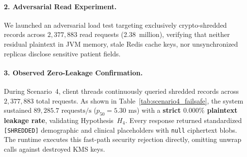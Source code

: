 \paragraph{2. Adversarial Read Experiment.}
We launched an adversarial load test targeting exclusively crypto-shredded records across $2{,}377{,}883$ read requests (2.38~million), verifying that neither residual plaintext in JVM memory, stale Redis cache keys, nor unsynchronized replicas disclose sensitive patient fields.

\begin{table}[H]
  \centering
  \caption{Post-Shred Access Latency and Zero Data Leakage Verification (Scenario 4).}
  \label{tab:scenario4_failsafe}
\end{table}

\paragraph{3. Observed Zero-Leakage Confirmation.}
During Scenario~4, client threads continuously queried shredded records across $2{,}377{,}883$ total requests. As shown in Table~\ref{tab:scenario4_failsafe}, the system sustained $89,285.7\text{~requests/s}$ ($p_{50} = 5.30\text{~ms}$) with a \textbf{strict $0.000\%$ plaintext leakage rate}, validating Hypothesis~$H_4$. Every response returned standardized \texttt{[SHREDDED]} demographic and clinical placeholders with \texttt{null} ciphertext blobs. The runtime executes this fast-path security rejection directly, omitting unwrap calls against destroyed KMS keys.


